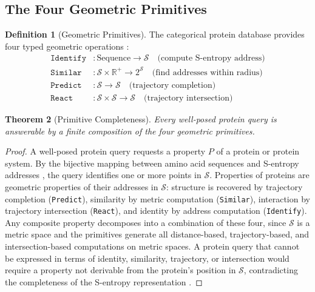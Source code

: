 \documentclass[11pt,twocolumn,a4paper]{article}
\newtheorem{theorem}{Theorem}[section]
\theoremstyle{definition}
\newtheorem{definition}[theorem]{Definition}
\theoremstyle{remark}
\newcommand{\Sspace}{\mathcal{S}}
\newcommand{\R}{\mathbb{R}}
\begin{document}
\subsection{The Four Geometric Primitives}

\begin{definition}[Geometric Primitives]
\label{def:primitives}
The categorical protein database provides four typed geometric operations \citep{sachikonye2025a}:
\begin{align}
\texttt{Identify} &: \text{Sequence} \to \Sspace \quad \text{(compute S-entropy address)} \\
\texttt{Similar} &: \Sspace \times \R^+ \to 2^{\Sspace} \quad \text{(find addresses within radius)} \\
\texttt{Predict} &: \Sspace \to \Sspace \quad \text{(trajectory completion)} \\
\texttt{React} &: \Sspace \times \Sspace \to \Sspace \quad \text{(trajectory intersection)}
\end{align}
\end{definition}

\begin{theorem}[Primitive Completeness]
\label{thm:primitive_completeness}
Every well-posed protein query is answerable by a finite composition of the four geometric primitives.
\end{theorem}

\begin{proof}
A well-posed protein query requests a property $P$ of a protein or protein system. By the bijective mapping between amino acid sequences and S-entropy addresses \citep{sachikonye2025f}, the query identifies one or more points in $\Sspace$. Properties of proteins are geometric properties of their addresses in $\Sspace$: structure is recovered by trajectory completion (\texttt{Predict}), similarity by metric computation (\texttt{Similar}), interaction by trajectory intersection (\texttt{React}), and identity by address computation (\texttt{Identify}). Any composite property decomposes into a combination of these four, since $\Sspace$ is a metric space and the primitives generate all distance-based, trajectory-based, and intersection-based computations on metric spaces. A protein query that cannot be expressed in terms of identity, similarity, trajectory, or intersection would require a property not derivable from the protein's position in $\Sspace$, contradicting the completeness of the S-entropy representation \citep{sachikonye2025a}.
\end{proof}
\end{document}
